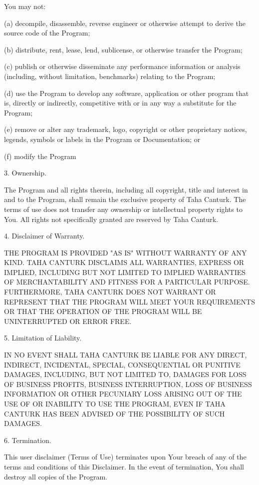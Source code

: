 \documentclass[a4paper,12pt]{article}
\begin{document}
You may not:

(a) decompile, disassemble, reverse engineer or otherwise attempt to derive the source code of the Program;

(b) distribute, rent, lease, lend, sublicense, or otherwise transfer the Program;

(c) publish or otherwise disseminate any performance information or analysis (including, without limitation, benchmarks) relating to the Program;

(d) use the Program to develop any software, application or other program that is, directly or indirectly, competitive with or in any way a substitute for the Program;

(e) remove or alter any trademark, logo, copyright or other proprietary notices, legends, symbols or labels in the Program or Documentation; or

(f) modify the Program

3. Ownership.

The Program and all rights therein, including all copyright, title and interest in and to the Program, shall remain the exclusive property of Taha Canturk. The terms of use does not transfer any ownership or intellectual property rights to You. All rights not specifically granted are reserved by Taha Canturk.

4. Disclaimer of Warranty.

THE PROGRAM IS PROVIDED "AS IS" WITHOUT WARRANTY OF ANY KIND. TAHA CANTURK DISCLAIMS ALL WARRANTIES, EXPRESS OR IMPLIED, INCLUDING BUT NOT LIMITED TO IMPLIED WARRANTIES OF MERCHANTABILITY AND FITNESS FOR A PARTICULAR PURPOSE. FURTHERMORE, TAHA CANTURK DOES NOT WARRANT OR REPRESENT THAT THE PROGRAM WILL MEET YOUR REQUIREMENTS OR THAT THE OPERATION OF THE PROGRAM WILL BE UNINTERRUPTED OR ERROR FREE.

5. Limitation of Liability.

IN NO EVENT SHALL TAHA CANTURK BE LIABLE FOR ANY DIRECT, INDIRECT, INCIDENTAL, SPECIAL, CONSEQUENTIAL OR PUNITIVE DAMAGES, INCLUDING, BUT NOT LIMITED TO, DAMAGES FOR LOSS OF BUSINESS PROFITS, BUSINESS INTERRUPTION, LOSS OF BUSINESS INFORMATION OR OTHER PECUNIARY LOSS ARISING OUT OF THE USE OF OR INABILITY TO USE THE PROGRAM, EVEN IF TAHA CANTURK HAS BEEN ADVISED OF THE POSSIBILITY OF SUCH DAMAGES.

6. Termination.

This user disclaimer (Terms of Use) terminates upon Your breach of any of the terms and conditions of this Disclaimer. In the event of termination, You shall destroy all copies of the Program.
\end{document}
